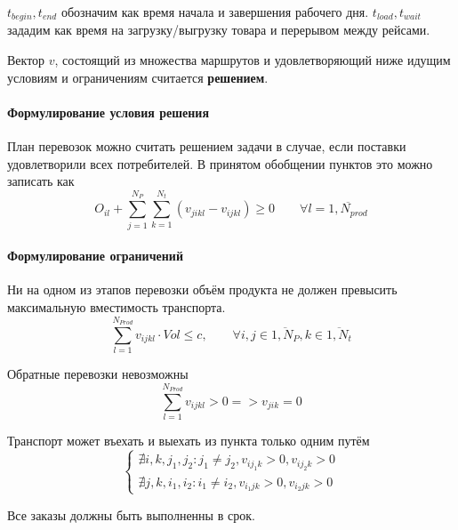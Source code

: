 	$t_{begin}, t_{end}$ обозначим как время начала и завершения рабочего дня. $t_{load}, t_{wait}$ зададим как время на загрузку/выгрузку товара и перерывом между рейсами.
	
	Вектор $v$, состоящий из множества маршрутов и удовлетворяющий ниже идущим условиям и ограничениям считается \textbf{решением}.
	
	\paragraph{Формулирование условия решения}    
	План перевозок можно считать решением задачи в случае, если поставки удовлетворили всех потребителей. В принятом обобщении пунктов это можно записать как
	\begin{equation}
		O_{il} + \sum_{j=1}^{N_P} \sum_{k=1}^{N_t} (v_{jikl} - v_{ijkl}) \ge 0 \qquad  \forall l = \overline{1, N_{prod}}
	\end{equation}
	
	\paragraph{Формулирование ограничений}     
	
	Ни на одном из этапов перевозки объём продукта не должен превысить максимальную вместимость транспорта.
	\begin{equation}
		\sum_{l=1}^{N_{Prod}} v_{ijkl} \cdot Vol \le c, \qquad \forall i, j \in \overline{1, N_P}, k \in \overline{1, N_t}
	\end{equation}

	Обратные перевозки невозможны
	\begin{equation}
		\sum_{l=1}^{N_{Prod}} v_{ijkl} > 0 => v_{jik} = 0
	\end{equation}

	Транспорт может въехать и выехать из пункта только одним путём
	\begin{equation}
		\left\{
		\begin{array}{ccc}
			\nexists i, k, j_1, j_2: j_1 \ne j_2, v_{ij_1k} > 0, v_{ij_2k} > 0 \\
			\nexists j, k, i_1, i_2: i_1 \ne i_2, v_{i_1jk} > 0, v_{i_2jk} > 0 
		\end{array}
		\right.
	\end{equation}

	Все заказы должны быть выполненны в срок. 
	
